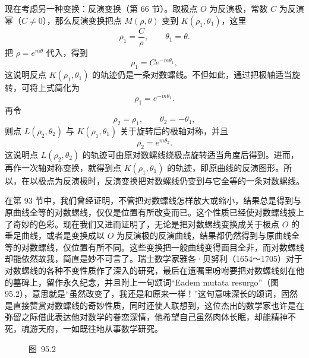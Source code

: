 现在考虑另一种变换：反演变换（第 66 节）。取极点 $O$ 为反演极，常数 $C$ 为反演幂（$C \neq 0$），那么反演变换把点 $M(\rho, \theta)$ 变到 $K(\rho_1, \theta_1)$，这里
\[
  \rho_1 = \frac{C}{\rho}, \qquad \theta_1 = \theta.
\]
把 $\rho = e^{m\theta}$ 代入，得到
\[
  \rho_1 = C e^{-m\theta_1},
\]
这说明反点 $K(\rho_1, \theta_1)$ 的轨迹仍是一条对数螺线。不但如此，通过把极轴适当旋转，可将上式简化为
\[
  \rho_1 = e^{-m\theta_1}.
\]
再令
\[
  \rho_2 = \rho_1, \qquad \theta_2 = -\theta_1,
\]
则点 $L(\rho_2, \theta_2)$ 与 $K(\rho_1, \theta_1)$ 关于旋转后的极轴对称，并且
\[
  \rho_2 = e^{m\theta_2}.
\]
这说明点 $L(\rho_2, \theta_2)$ 的轨迹可由原对数螺线绕极点旋转适当角度后得到。进而，再作一次轴对称变换，就得到点 $K(\rho_1, \theta_1)$ 的轨迹，即原曲线的反演图形。所以，在以极点为反演极时，反演变换把对数螺线仍变到与它全等的一条对数螺线。

在第 93 节中，我们曾经证明，不管把对数螺线怎样放大或缩小，结果总是得到与原曲线全等的对数螺线，仅仅是位置有所改变而已。这个性质已经使对数螺线披上了奇妙的色彩。现在我们又进而证明了，无论是把对数螺线变换成关于极点 $O$ 的垂足曲线，或者是变换成以 $O$ 为反演极的反演曲线，结果都仍然得到与原曲线全等的对数螺线，仅位置有所不同。这些变换把一般曲线变得面目全非，而对数螺线却能依然故我，简直是妙不可言了。瑞士数学家雅各·贝努利（1654～1705）对于对数螺线的各种不变性质作了深入的研究，最后在遗嘱里吩咐要把对数螺线刻在他的墓碑上，留作永久纪念，并且附上一句颂词“Eadem mutata resurgo”（图 95.2），意思就是“虽然改变了，我还是和原来一样！”这句意味深长的颂词，固然是直接赞赏对数螺线的奇妙性质，同时还使人联想到，这位杰出的数学家也许是在弥留之际借此表达他对数学的眷恋深情，他希望自己虽然肉体长眠，却能精神不死，魂游天府，一如既往地从事数学研究。

\begin{figure}[htbp]
  \centering
  \caption*{图\ 95.2}
\end{figure}

